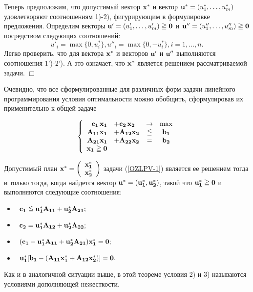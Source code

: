     Теперь предположим, что допустимый вектор $\mathbf{x}^{*}$ и
    вектор $\mathbf{u}^{*}=(u_{1}^{*},\ldots,u_{m}^{*})$ удовлетворяют
    соотношениям 1)-2), фигурирующим в формулировке предложения.
    Определим векторы $\mathbf{u'}=(u'_{1},\ldots,u'_{m})\geqq\mathbf{0}$ и
    $\mathbf{u''}=(u''_{1},\ldots,u''_{m})\geqq\mathbf{0}$ посредством
    следующих соотношений:
    \[u'_{i}=\max\{0,u^{*}_{i}\}, u''_{i}=\max\{0,-u^{*}_{i}\}, i=1,\ldots,n.\]
    Легко проверить, что для вектора $\mathbf{x}^{*}$ и векторов $\mathbf{u'}$ и
    $\mathbf{u''}$ выполняются соотношения 1')-2'). А это означает, что
    $\mathbf{x}^{*}$ является решением рассматриваемой задачи. $\Box$


    Очевидно, что все сформулированные для различных форм задачи
    линейного программирования условия оптимальности можно обобщить,
    сформулировав их применительно к общей задаче


\begin{equation}\label{OZLPV-1}
\left\{
\begin{array}{rlcc}
    \mathbf{c_1} \, \mathbf{x_1} &+ \mathbf{c_2} \, \mathbf{x_2} &\to & \max \\
   \mathbf{A_{11}} \mathbf{x_1}          &+ \mathbf{A_{12}} \mathbf{x_2} & \leqq &\mathbf{b_1}\\
  \mathbf{A_{21}}  \mathbf{x_1}          &+ \mathbf{A_{22}} \mathbf{x_2} & = &\mathbf{b_2}\\
  \mathbf{x_1} \geqq \mathbf{0}&\\
\end{array} \right.
\end{equation}

\begin{teo}\label{usl-opt-obschaya}
    Допустимый план $\mathbf{x^{*}}=\left(
                                 \begin{array}{c}
                                   \mathbf{x_{1}^{*}} \\
                                   \mathbf{x_{2}^{*}} \\
                                 \end{array}
                               \right)$
    задачи (\ref{OZLPV-1}) является ее решением тогда и только
    тогда, когда найдется вектор
    $\mathbf{u^{*}}=(\mathbf{u_{1}^{*}},\mathbf{u_{2}^{*}})$, такой что
    $\mathbf{u_{1}^{*}}\geqq\mathbf{0}$ и выполняются следующие соотношения:
\begin{itemize}
    \item [$1')$\ ] \
    $\mathbf{c_{1}}\leqq\mathbf{u_{1}^{*}}\mathbf{A_{11}}+\mathbf{u_{2}^{*}}\mathbf{A_{21}};$
    \item [$1'')$\ ] \
    $\mathbf{c_{2}}=\mathbf{u_{1}^{*}}\mathbf{A_{12}}+\mathbf{u_{2}^{*}}\mathbf{A_{22}};$
    \item [$2)$\ ] \
    $(\mathbf{c_{1}}-\mathbf{u_{1}^{*}}\mathbf{A_{11}}+\mathbf{u_{2}^{*}}\mathbf{A_{21}})\mathbf{x_{1}^{*}}=\mathbf{0};$
    \item [$3)$\ ] \
    $\mathbf{u_{1}^{*}}[\mathbf{b_{1}}-(\mathbf{A_{11}}\mathbf{x_{1}^{*}}+\mathbf{A_{12}}\mathbf{x_{2}^{*}})]=\mathbf{0}.$
\end{itemize}
\end{teo}
    Как и в аналогичной ситуации выше, в этой теореме условия 2) и
    3) называются условиями дополняющей нежесткости.


